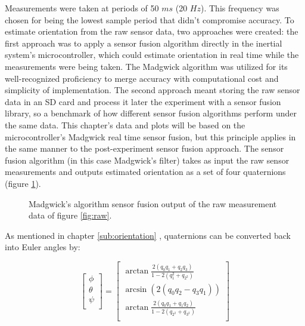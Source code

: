 Measurements were taken at periods of 50 $ms$ (20 $Hz$). This frequency was chosen for being the lowest sample period that didn't compromise accuracy. To estimate orientation from the raw sensor data, two approaches were created: the first approach was to apply a sensor fusion algorithm directly in the inertial system's microcontroller, which could estimate orientation in real time while the measurements were being taken. The Madgwick algorithm was utilized for its well-recognized proficiency to merge accuracy with computational cost and simplicity of implementation. The second approach meant storing the raw sensor data in an SD card and process it later the experiment with a sensor fusion library, so a benchmark of how different sensor fusion algorithms perform under the same data. This chapter's data and plots will be based on the microcontroller's Madgwick real time sensor fusion, but this principle applies in the same manner to the post-experiment sensor fusion approach. The sensor fusion algorithm (in this case Madgwick's filter) takes as input the raw sensor measurements and outputs estimated orientation as a set of four quaternions (figure \ref{fig:fusion_output}).


\begin{figure}[!h]
    \centering
    \resizebox{0.8\linewidth}{!}{}
    \caption{Madgwick's algorithm sensor fusion output of the raw measurement data of figure \ref{fig:raw}.}
    \label{fig:fusion_output}
\end{figure}


As mentioned in chapter \ref{sub:orientation} , quaternions can be converted back into Euler angles by:

\begin{equation}
    \begin{bmatrix}
        \phi   \\
        \theta \\
        \psi   \\
    \end{bmatrix}
    =
    \begin{bmatrix}
        \arctan \frac{2(q_0q_1+q_2q_3)}{1-2(q{_1^2}+q_{2^2})} \\
        \arcsin (2(q_0q_2-q_3q_1))                            \\
        \arctan \frac{2(q_0q_1+q_1q_2)}{1-2(q_{2^2}+q_{3^2})} \\
    \end{bmatrix}
\end{equation}

